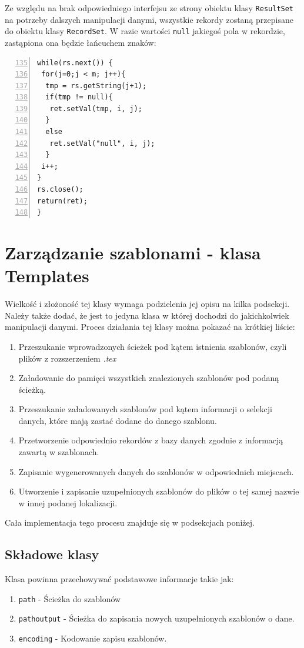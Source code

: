 Ze względu na brak odpowiedniego interfejsu ze strony obiektu klasy \texttt{ResultSet} na potrzeby dalszych manipulacji danymi, wszystkie rekordy zostaną przepisane do obiektu klasy \texttt{RecordSet}. W razie wartości  \texttt{null} jakiegoś pola w rekordzie, zastąpiona ona będzie łańcuchem znaków:
\begin{lstlisting}[numbers=left,firstnumber=135]
while(rs.next()) {
 for(j=0;j < m; j++){
  tmp = rs.getString(j+1);
  if(tmp != null){
   ret.setVal(tmp, i, j);
  }
  else
   ret.setVal("null", i, j);
  }
 i++;
}   
rs.close();
return(ret);
}
\end{lstlisting}


\section{Zarządzanie szablonami - klasa Templates}

Wielkość i złożoność tej klasy wymaga podzielenia jej opisu na kilka podsekcji. Należy także dodać, że jest to jedyna klasa w której dochodzi do jakichkolwiek manipulacji danymi. Proces działania tej klasy można pokazać na krótkiej liście:
\vspace{5mm}
    \begin{enumerate}
    \item Przeszukanie wprowadzonych ścieżek pod kątem istnienia szablonów, czyli plików z rozszerzeniem \emph{.tex}
    \item Załadowanie do pamięci wszystkich znalezionych szablonów pod podaną ścieżką.
    \item Przeszukanie załadowanych szablonów pod kątem informacji o selekcji danych, które mają zastać dodane do danego szablonu.
    \item Przetworzenie odpowiednio rekordów z bazy danych zgodnie z informacją zawartą w szablonach.
    \item Zapisanie wygenerowanych danych do szablonów w odpowiednich miejscach.
    \item Utworzenie i zapisanie uzupełnionych szablonów do plików o tej samej nazwie w innej podanej lokalizacji.
     \end{enumerate}
\vspace{5mm}
Cała implementacja tego procesu znajduje się w podsekcjach poniżej. 
\subsection{Składowe klasy}

Klasa powinna przechowywać podstawowe informacje takie jak:
    \begin{enumerate}
    \item \texttt{path} - Ścieżka do szablonów
    \item \texttt{pathoutput}  - Ścieżka do zapisania nowych uzupełnionych szablonów o dane.
    \item \texttt{encoding} - Kodowanie zapisu szablonów.
     \end{enumerate}

